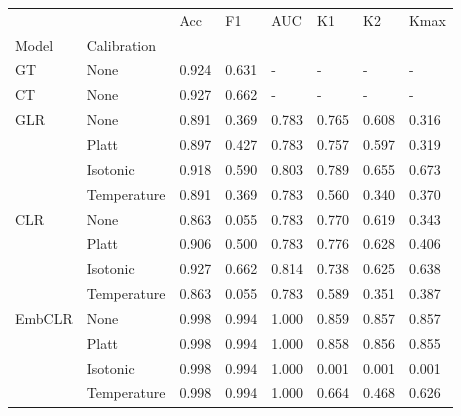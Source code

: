 \begin{tabular}{llllllll}
\toprule
 &  & Acc & F1 & AUC & K1 & K2 & Kmax \\
Model & Calibration &  &  &  &  &  &  \\
\midrule
GT & None & 0.924 & 0.631 & - & - & - & - \\
\cline{1-8}
CT & None & 0.927 & 0.662 & - & - & - & - \\
\cline{1-8}
\multirow[t]{4}{*}{GLR} & None & 0.891 & 0.369 & 0.783 & 0.765 & 0.608 & 0.316 \\
 & Platt & 0.897 & 0.427 & 0.783 & 0.757 & 0.597 & 0.319 \\
 & Isotonic & 0.918 & 0.590 & 0.803 & 0.789 & 0.655 & 0.673 \\
 & Temperature & 0.891 & 0.369 & 0.783 & 0.560 & 0.340 & 0.370 \\
\cline{1-8}
\multirow[t]{4}{*}{CLR} & None & 0.863 & 0.055 & 0.783 & 0.770 & 0.619 & 0.343 \\
 & Platt & 0.906 & 0.500 & 0.783 & 0.776 & 0.628 & 0.406 \\
 & Isotonic & 0.927 & 0.662 & 0.814 & 0.738 & 0.625 & 0.638 \\
 & Temperature & 0.863 & 0.055 & 0.783 & 0.589 & 0.351 & 0.387 \\
\cline{1-8}
\multirow[t]{4}{*}{EmbCLR} & None & 0.998 & 0.994 & 1.000 & 0.859 & 0.857 & 0.857 \\
 & Platt & 0.998 & 0.994 & 1.000 & 0.858 & 0.856 & 0.855 \\
 & Isotonic & 0.998 & 0.994 & 1.000 & 0.001 & 0.001 & 0.001 \\
 & Temperature & 0.998 & 0.994 & 1.000 & 0.664 & 0.468 & 0.626 \\
\cline{1-8}
\bottomrule
\end{tabular}
